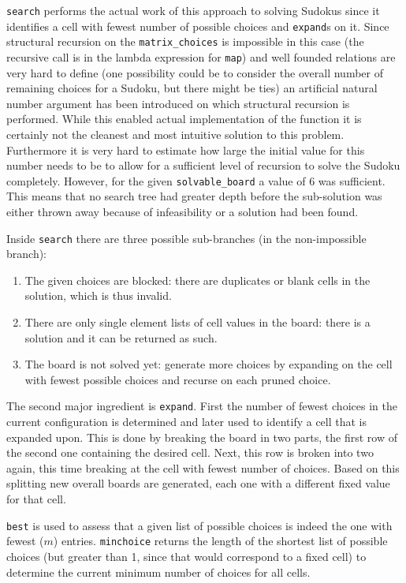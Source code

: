 \documentclass[a4paper,11pt]{article}
\begin{document}
\texttt{search} performs the actual work of this approach to solving Sudokus since it identifies a cell with fewest number of possible choices and \texttt{expand}s on it. Since structural recursion on the \texttt{matrix\_choices} is impossible in this case (the recursive call is in the lambda expression for \texttt{map}) and well founded relations are very hard to define (one possibility could be to consider the overall number of remaining choices for a Sudoku, but there might be ties) an artificial natural number argument has been introduced on which structural recursion is performed. While this enabled actual implementation of the function it is certainly not the cleanest and most intuitive solution to this problem. Furthermore it is very hard to estimate how large the initial value for this number needs to be to allow for a sufficient level of recursion to solve the Sudoku completely. However, for the given \texttt{solvable\_board} a value of 6 was sufficient. This means that no search tree had greater depth before the sub-solution was either thrown away because of infeasibility or a solution had been found.

Inside \texttt{search} there are three possible sub-branches (in the non-impossible branch):
\begin{enumerate}
  \item The given choices are blocked: there are duplicates or blank cells in the solution, which is thus invalid.
  \item There are only single element lists of cell values in the board: there is a solution and it can be returned as such.
  \item The board is not solved yet: generate more choices by expanding on the cell with fewest possible choices and recurse on each pruned choice.
\end{enumerate}

The second major ingredient is \texttt{expand}. First the number of fewest choices in the current configuration is determined and later used to identify a cell that is expanded upon. This is done by breaking the board in two parts, the first row of the second one containing the desired cell. Next, this row is broken into two again, this time breaking at the cell with fewest number of choices. Based on this splitting new overall boards are generated, each one with a different fixed value for that cell.

\texttt{best} is used to assess that a given list of possible choices is indeed the one with fewest (\(m\)) entries. \texttt{minchoice} returns the length of the shortest list of possible choices (but greater than 1, since that would correspond to a fixed cell) to determine the current minimum number of choices for all cells.
\end{document}
